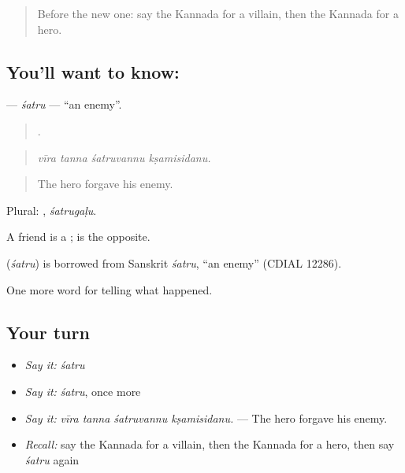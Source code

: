\label{lesson:KA-C367-satru}



\begin{quote}
Before the new one: say the Kannada for a villain, then the Kannada for a hero.
\end{quote}

\subsection*{You'll want to know: }
\textbf{} — \emph{śatru} — \textquotedblleft{}an enemy\textquotedblright{}.

\begin{quote}
   .
\end{quote}

\begin{quote}
\emph{vīra tanna śatruvannu kṣamisidanu.}
\end{quote}

\begin{quote}
The hero forgave his enemy.
\end{quote}

Plural: , \emph{śatrugaḷu}.

A friend is a ;  is the opposite.

\begin{cousinweb}
\textbf{} (\emph{śatru}) is borrowed from Sanskrit \emph{śatru}, \textquotedblleft{}an enemy\textquotedblright{} (CDIAL 12286).
\end{cousinweb}

\begin{grammarlens}[title={What you've built}]
One more word for telling what happened.
\end{grammarlens}

\subsection*{Your turn}
\begin{itemize}
\raggedright
  \item \emph{Say it:} \emph{śatru}
  \item \emph{Say it:} \emph{śatru}, once more
  \item \emph{Say it:} \emph{vīra tanna śatruvannu kṣamisidanu.} — The hero forgave his enemy.
  \item \emph{Recall:} say the Kannada for a villain, then the Kannada for a hero, then say \emph{śatru} again
\end{itemize}

